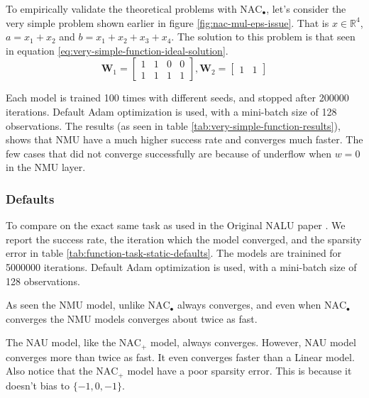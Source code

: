 To empirically validate the theoretical problems with $\mathrm{NAC}_{\bullet}$, let's consider the very simple problem shown earlier in figure \ref{fig:nac-mul-eps-issue}. That is $x \in \mathbb{R}^4$, $a = x_1 + x_2$ and $b = x_1 + x_2 + x_3 + x_4$. The solution to this problem is that seen in equation \ref{eq:very-simple-function-ideal-solution}.
\begin{equation}
    \mathbf{W}_1 = \begin{bmatrix}
    1 & 1 & 0 & 0 \\
    1 & 1 & 1 & 1
    \end{bmatrix}, \mathbf{W}_2 = \begin{bmatrix}
    1 & 1
    \end{bmatrix}
    \label{eq:very-simple-function-ideal-solution}
\end{equation}

Each model is trained 100 times with different seeds, and stopped after 200000 iterations. Default Adam optimization is used, with a mini-batch size of 128 observations. The results (as seen in table \ref{tab:very-simple-function-results}), shows that NMU have a much higher success rate and converges much faster. The few cases that did not converge successfully are because of underflow when $w = 0$ in the NMU layer.



\subsubsection{Defaults}

To compare on the exact same task as used in the Original NALU paper \cite{trask-nalu}. We report the success rate, the iteration which the model converged, and the sparsity error in table \ref{tab:function-task-static-defaults}. The models are trainined for 5000000 iterations. Default Adam optimization is used, with a mini-batch size of 128 observations.

As seen the NMU model, unlike $\mathrm{NAC}_{\bullet}$ always converges, and even when $\mathrm{NAC}_{\bullet}$ converges the NMU models converges about twice as fast.

The NAU model, like the $\mathrm{NAC}_{+}$ model, always converges. However, NAU model converges more than twice as fast. It even converges faster than a Linear model. Also notice that the $\mathrm{NAC}_{+}$ model have a poor sparsity error. This is because it doesn't bias to $\{-1, 0, -1\}$.

